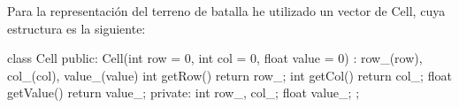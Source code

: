 Para la representación del terreno de batalla he utilizado un vector de Cell, cuya estructura es la siguiente:

class Cell {
    public:
        Cell(int row = 0, int col = 0, float value = 0) : row_(row), col_(col), value_(value) {}
        int getRow() { return row_; }
        int getCol() { return col_; }
        float getValue() { return value_; }
    private:
        int row_, col_;
        float value_;
};